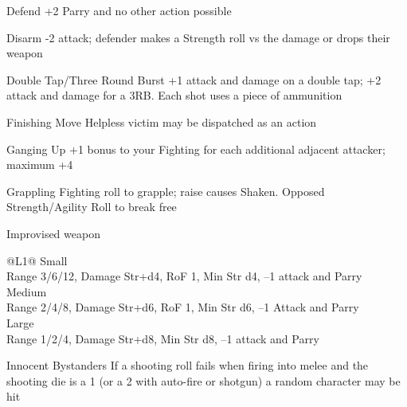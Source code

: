 \begin{genericsection}{Defend}
+2 Parry and no other action possible
\end{genericsection}

\begin{genericsection}{Disarm}
-2 attack; defender makes a Strength roll vs the damage or drops their weapon
\end{genericsection}

\begin{genericsection}{Double Tap/Three Round Burst}
+1 attack and damage on a double tap; +2 attack and damage for a 3RB. Each shot uses a piece of ammunition
\end{genericsection}

\begin{genericsection}{Finishing Move}
Helpless victim may be dispatched as an action
\end{genericsection}

\begin{genericsection}{Ganging Up}
+1 bonus to your Fighting for each additional adjacent attacker; maximum +4
\end{genericsection}

\begin{genericsection}{Grappling}
Fighting roll to grapple; raise causes Shaken. Opposed Strength/Agility Roll to break free
\end{genericsection}

\begin{genericsection}{Improvised weapon}
    \begin{redtable}{\linewidth}{@{}L{1}@{}}
      Small\\
      Range 3/6/12, Damage Str+d4, RoF 1, Min Str d4, –1 attack and Parry\\
      Medium\\
      Range 2/4/8, Damage Str+d6, RoF 1, Min Str d6, –1 Attack and Parry\\
      Large\\
      Range 1/2/4, Damage Str+d8, Min Str d8, –1 attack and Parry\\
    \end{redtable}
\end{genericsection}

\begin{genericsection}{Innocent Bystanders}
If a shooting roll fails when firing into melee and the shooting die is a 1 (or a 2 with auto-fire or shotgun) a random character may be hit
\end{genericsection}

